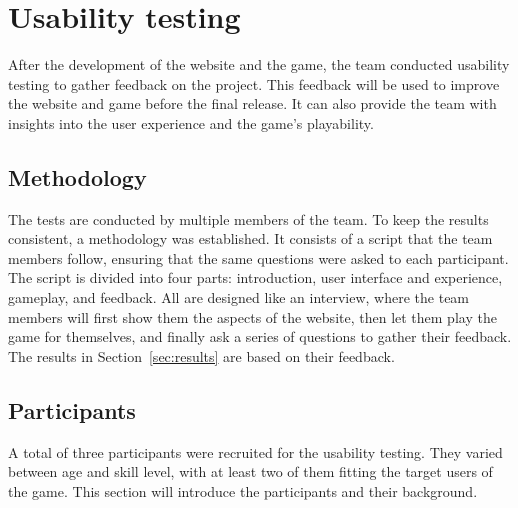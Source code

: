 \chapter{Usability testing}\label{ch:usability-testing}

After the development of the website and the game,
the team conducted usability testing to gather feedback on the project.
This feedback will be used to improve the website and game before the final release.
It can also provide the team with insights into the user experience and the game's playability.

\section{Methodology}\label{sec:methodology}

The tests are conducted by multiple members of the team.
To keep the results consistent, a methodology was established.
It consists of a script that the team members follow, ensuring that the same questions were asked to each participant.
The script is divided into four parts: introduction, user interface and experience, gameplay, and feedback.
All are designed like an interview, where the team members will first show them the aspects of the website,
then let them play the game for themselves, and finally ask a series of questions to gather their feedback.
The results in Section~\ref{sec:results} are based on their feedback.

\section{Participants}\label{sec:participants}

A total of three participants were recruited for the usability testing.
They varied between age and skill level, with at least two of them fitting the target users of the game.
This section will introduce the participants and their background.

